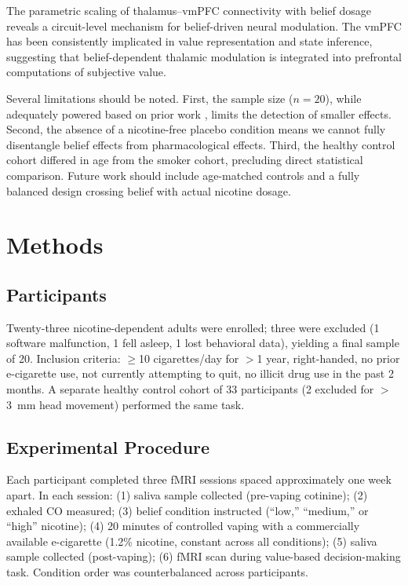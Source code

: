 \documentclass[11pt]{article}
\begin{document}
The parametric scaling of thalamus--vmPFC connectivity with belief dosage reveals a circuit-level mechanism for belief-driven neural modulation. The vmPFC has been consistently implicated in value representation \citep{bartra2013} and state inference, suggesting that belief-dependent thalamic modulation is integrated into prefrontal computations of subjective value.

Several limitations should be noted. First, the sample size ($n = 20$), while adequately powered based on prior work \citep{gu2015, faul2007}, limits the detection of smaller effects. Second, the absence of a nicotine-free placebo condition means we cannot fully disentangle belief effects from pharmacological effects. Third, the healthy control cohort differed in age from the smoker cohort, precluding direct statistical comparison. Future work should include age-matched controls and a fully balanced design crossing belief with actual nicotine dosage.

\section{Methods}

\subsection{Participants}

Twenty-three nicotine-dependent adults were enrolled; three were excluded (1 software malfunction, 1 fell asleep, 1 lost behavioral data), yielding a final sample of 20. Inclusion criteria: $\geq$10 cigarettes/day for $>$1 year, right-handed, no prior e-cigarette use, not currently attempting to quit, no illicit drug use in the past 2 months. A separate healthy control cohort of 33 participants (2 excluded for $>$3~mm head movement) performed the same task.

\subsection{Experimental Procedure}

Each participant completed three fMRI sessions spaced approximately one week apart. In each session: (1) saliva sample collected (pre-vaping cotinine); (2) exhaled CO measured; (3) belief condition instructed (``low,'' ``medium,'' or ``high'' nicotine); (4) 20 minutes of controlled vaping with a commercially available e-cigarette (1.2\% nicotine, constant across all conditions); (5) saliva sample collected (post-vaping); (6) fMRI scan during value-based decision-making task. Condition order was counterbalanced across participants.
\end{document}

